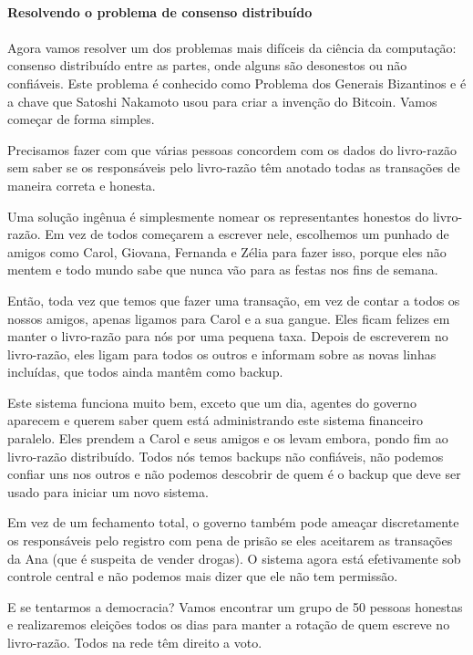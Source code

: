 \paragraph{Resolvendo o problema de consenso distribuído}
\paragraph{}
Agora vamos resolver um dos problemas mais difíceis da ciência da computação: consenso distribuído entre as partes, onde alguns são desonestos ou não confiáveis. Este problema é conhecido como Problema dos Generais Bizantinos e é a chave que Satoshi Nakamoto usou para criar a invenção do Bitcoin. Vamos começar de forma simples.

Precisamos fazer com que várias pessoas concordem com os dados do livro-razão sem saber se os  responsáveis pelo livro-razão têm anotado todas as transações de maneira correta e honesta.

Uma solução ingênua é simplesmente nomear os representantes honestos do livro-razão. Em vez de todos começarem a escrever nele, escolhemos um punhado de amigos como Carol, Giovana, Fernanda e Zélia para fazer isso, porque eles não mentem e todo mundo sabe que nunca vão para as festas nos fins de semana.

Então, toda vez que temos que fazer uma transação, em vez de contar a todos os nossos amigos, apenas ligamos para Carol e a sua gangue. Eles ficam felizes em manter o livro-razão para nós por uma pequena taxa. Depois de escreverem no livro-razão, eles ligam para todos os outros e informam sobre as novas linhas incluídas, que todos ainda mantêm como backup.

Este sistema funciona muito bem, exceto que um dia, agentes do governo aparecem e querem saber quem está administrando este sistema financeiro paralelo. Eles prendem a Carol e seus amigos e os levam embora, pondo fim ao livro-razão distribuído. Todos nós temos backups não confiáveis, não podemos confiar uns nos outros e não podemos descobrir de quem é o backup que deve ser usado para iniciar um novo sistema.

Em vez de um fechamento total, o governo também pode ameaçar discretamente os responsáveis pelo registro com pena de prisão se eles aceitarem as transações da Ana (que é suspeita de vender drogas). O sistema agora está efetivamente sob controle central e não podemos mais dizer que ele não tem permissão.

E se tentarmos a democracia? Vamos encontrar um grupo de 50 pessoas honestas e realizaremos eleições todos os dias para manter a rotação de quem escreve no livro-razão. Todos na rede têm direito a voto.

